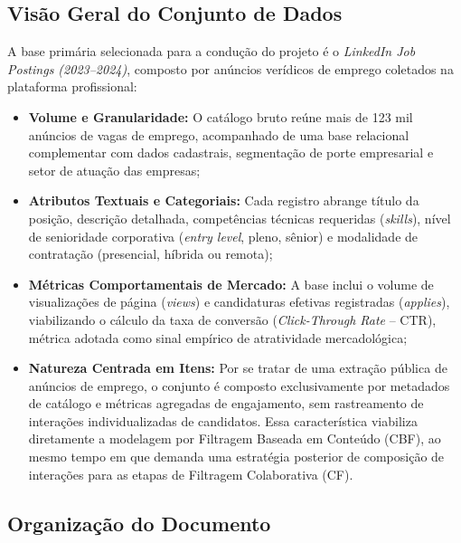 \subsection{Visão Geral do Conjunto de Dados}

A base primária selecionada para a condução do projeto é o \textit{LinkedIn Job Postings (2023--2024)}, composto por anúncios verídicos de emprego coletados na plataforma profissional:
\begin{itemize}
    \item \textbf{Volume e Granularidade:} O catálogo bruto reúne mais de 123 mil anúncios de vagas de emprego, acompanhado de uma base relacional complementar com dados cadastrais, segmentação de porte empresarial e setor de atuação das empresas;
    \item \textbf{Atributos Textuais e Categoriais:} Cada registro abrange título da posição, descrição detalhada, competências técnicas requeridas (\textit{skills}), nível de senioridade corporativa (\textit{entry level}, pleno, sênior) e modalidade de contratação (presencial, híbrida ou remota);
    \item \textbf{Métricas Comportamentais de Mercado:} A base inclui o volume de visualizações de página (\textit{views}) e candidaturas efetivas registradas (\textit{applies}), viabilizando o cálculo da taxa de conversão (\textit{Click-Through Rate} -- CTR), métrica adotada como sinal empírico de atratividade mercadológica;
    \item \textbf{Natureza Centrada em Itens:} Por se tratar de uma extração pública de anúncios de emprego, o conjunto é composto exclusivamente por metadados de catálogo e métricas agregadas de engajamento, sem rastreamento de interações individualizadas de candidatos. Essa característica viabiliza diretamente a modelagem por Filtragem Baseada em Conteúdo (CBF), ao mesmo tempo em que demanda uma estratégia posterior de composição de interações para as etapas de Filtragem Colaborativa (CF).
\end{itemize}

\subsection{Organização do Documento}

